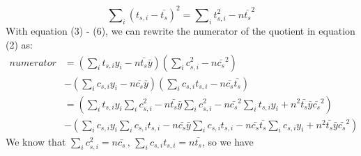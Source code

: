 \begin{appendices}
\begin{equation}\label{ap:eq7}
\sum\nolimits_i \left( t_{s,i}-\bar{t_{s}} \right)^{2} =\sum\nolimits_i t_{s,i}^{2} -n\bar{t_{s}}^{2}
\end{equation}
With equation (3) - (6), we can rewrite the numerator of the quotient in
equation (2) as:
\begin{equation}\label{ap:eq8}
\begin{aligned}
numerator&=\left( \sum\nolimits_i {t_{s,i}y_{i}} -n\bar{t_{s}}\bar{y} \right)\left( \sum\nolimits_i c_{s,i}^{2} -n\bar{c_{s}}^{2} \right)\\
&-\left( \sum\nolimits_i {c_{s,i}y_{i}} -n\bar{c_{s}}\bar{y} \right)\left( \sum\nolimits_i {c_{s,i}t_{s,i}} -n\bar{c_{s}}\bar{t_{s}} \right)\\
&=\left( \sum\nolimits_i {t_{s,i}y_{i}} \sum\nolimits_i c_{s,i}^{2} -n\bar{t_{s}}\bar{y}\sum\nolimits_i c_{s,i}^{2} -n\bar{c_{s}}^{2}\sum\nolimits_i {t_{s,i}y_{i}}
+n^{2}\bar{t_{s}}\bar{y}\bar{c_{s}}^{2} \right)\\
&-\left( \sum\nolimits_i {c_{s,i}y_{i}} \sum\nolimits_i {c_{s,i}t_{s,i}} -n\bar{c_{s}}\bar{y}\sum\nolimits_i {c_{s,i}t_{s,i}} -n\bar{c_{s}}\bar{t_{s}}\sum\nolimits_i {c_{s,i}y_{i}} +n^{2}\bar{t_{s}}\bar{y}\bar{c_{s}}^{2} \right)
\end{aligned}
\end{equation}
We know that $\sum\nolimits_i c_{s,i}^{2} =n\bar{c_{s}}\mathrm{\, ,\,}\sum\nolimits_i c_{s,i}t_{s,i}=n\bar{t_{s}}$, so we have


\end{appendices}
